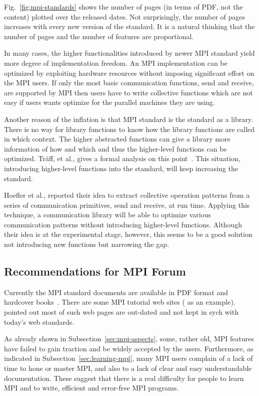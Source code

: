 \documentclass[preprint,5p,times]{elsarticle}
\begin{document}
Fig.~\ref{fig:mpi-standards} shows the number of pages (in terms of PDF, not the
content) plotted over the released dates. Not surprisingly, the number of pages
increases with every new version of the standard. It is a natural thinking that
the number of pages and the number of features are proportional.

In many cases, the higher functionalities introduced by newer MPI standard yield
more degree of implementation freedom. An MPI implementation can be optimized by
exploiting hardware resources without imposing significant effort on the MPI
users. If only the most basic communication functions, send and receive, are
supported by MPI then users have to write collective functions which are not
easy if users wants optimize for the parallel machines they are using.

Another reason of the inflation is that MPI standard is the standard
as a library. There is no way for library functions to know how the
library functions are called in which context. The higher abstracted
functions can give a library more information of how and which and
thus the higher-level functions can be optimized. Tr\"{a}ff, et al., gives
a formal analysis on this point~\cite{5184825}.
This situation, introducing higher-level functions into the standard,
will keep increasing the standard.

Hoefler et al., reported their idea to extract collective operation
patterns from a series of communication primitives, send and
receive\cite{7842939}, at run time. Applying this technique, a
communication library will be able to optimize various communication
patterns without introducing higher-level functions.
Although their idea is at the experimental
stage, however, this seems to be a good solution not introducing new
functions but narrowing the gap.

\subsection{Recommendations for MPI Forum}

Currently the MPI standard documents are available in PDF format and
hardcover books~\cite{mpi-hardcover}. There are some MPI tutorial web
sites (\cite{mpi-tutorial} as an example). \cite{mpi-tutorial-intro}
pointed out most of such web pages are out-dated and not
kept in sych with today's web standards.

As already shown in Subsection~\ref{sec:mpi-aspects}, some, rather old, MPI
features have failed to gain traction and be widely accepted by the users.
Furthermore, as indicated in Subsection~\ref{sec:learning-mpi}, many MPI users
complain of a lack of time to hone or master MPI, and also to a lack of clear
and easy understandable documentation. These suggest that there is a real
difficulty for people to learn MPI and to write, efficient and error-free MPI programs.
\end{document}
